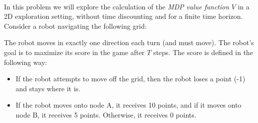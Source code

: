 \documentclass[submit]{harvardml}
\begin{document}
\begin{problem}
  ~

  
  \noindent In this problem we will explore the calculation of the \emph{MDP value function} $V$  in a 2D exploration setting, without time discounting and
for a finite time horizon. 
%
Consider a robot navigating the following grid:\\
  \begin{center}
\end{center}
The robot moves in exactly one direction each turn (and must move). The robot's goal is to maximize its score in the game after $T$ steps. The
score is defined in the following way:
%
\begin{itemize}
  \item If the robot attempts to move off the grid, then the robot loses a point (-1) and stays where it is.
  \item If the robot moves onto node A, it receives 10 points, and if it moves onto node B, it receives 5 points. Otherwise, it receives 0 points.
\end{itemize}


\end{problem}
\end{document}
